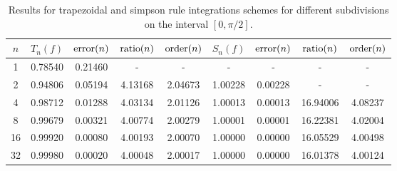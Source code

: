 \begin{table}[H]
\centering
\caption{Results for trapezoidal and simpson rule integrations schemes for different subdivisions on the interval $[0,\pi/2]$.}
\begin{tabular}{ccccccccc}
\toprule
$n$ & $T_n(f)$ & ${\rm error}(n)$ & ${\rm ratio}(n)$ & ${\rm order}(n)$ & $S_n(f)$ & ${\rm error}(n)$ & ${\rm ratio}(n)$ & ${\rm order}(n)$ \\
\midrule
  1 &  0.78540 &          0.21460 &                - &                - &        - &                - &                - &                - \\
  2 &  0.94806 &          0.05194 &          4.13168 &          2.04673 &  1.00228 &          0.00228 &                - &                - \\
  4 &  0.98712 &          0.01288 &          4.03134 &          2.01126 &  1.00013 &          0.00013 &         16.94006 &          4.08237 \\
  8 &  0.99679 &          0.00321 &          4.00774 &          2.00279 &  1.00001 &          0.00001 &         16.22381 &          4.02004 \\
 16 &  0.99920 &          0.00080 &          4.00193 &          2.00070 &  1.00000 &          0.00000 &         16.05529 &          4.00498 \\
 32 &  0.99980 &          0.00020 &          4.00048 &          2.00017 &  1.00000 &          0.00000 &         16.01378 &          4.00124 \\
\bottomrule
\end{tabular}
\end{table}
